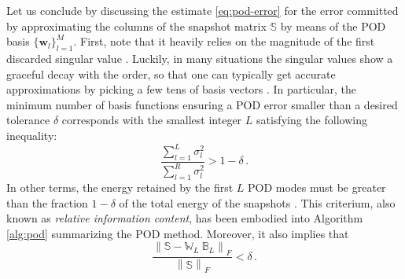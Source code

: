 \documentclass[12pt, a4paper, twoside, openright, notitlepage]{report}
\numberwithin{equation}{chapter}
\theoremstyle{theorem}
\theoremstyle{definition}
\theoremstyle{remark}
\theoremstyle{proposition}
\numberwithin{figure}{chapter}
\newcommand{\norm}[1]{\left\lVert#1\right\rVert}
\begin{document}
		Let us conclude by discussing the estimate \eqref{eq:pod-error} for the error committed by approximating the columns of the snapshot matrix $\mathbb{S}$ by means of the POD basis $\big\lbrace \mathbf{w}_l \big\rbrace_{l = 1}^M$. First, note that it heavily relies on the magnitude of the first discarded singular value \cite{HSR16}. Luckily, in many situations the singular values show a graceful decay with the order, so that one can typically get accurate approximations by picking a few tens of basis vectors \cite{Bur06}. In particular, the minimum number of basis functions ensuring a POD error smaller than a desired tolerance $\delta$ corresponds with the smallest integer $L$ satisfying the following inequality:
		\begin{equation}
			\label{eq:relative-information-content}
			\dfrac{\sum_{l = 1}^{L} \sigma_l^2}{\sum_{l = 1}^R \sigma_l^2} > 1 - \delta \, .
		\end{equation}
		In other terms, the energy retained by the first $L$ POD modes must be greater than the fraction $1 - \delta$ of the total energy of the snapshots \cite{QMN15}. This criterium, also known as \emph{relative information content}, has been embodied into Algorithm \ref{alg:pod} summarizing the POD method. Moreover, it also implies that
		\begin{equation*}
			\dfrac{\norm{\mathbb{S} - \mathbb{W}_{L} ~ \mathbb{B}_{L}}_F}{\norm{\mathbb{S}}_F} < \delta \, .
		\end{equation*}
\end{document}
